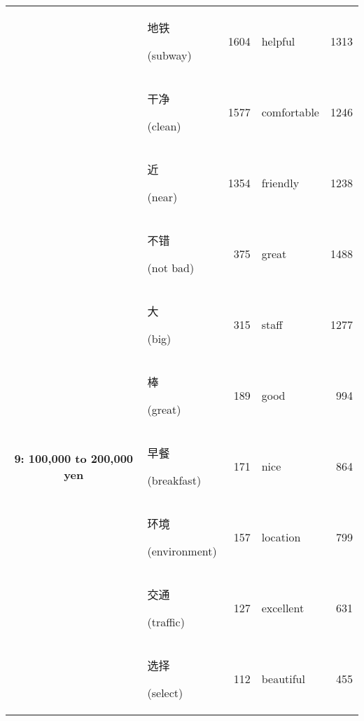 \documentclass[smallextended,natbib]{svjour3}       %
\begin{document}
\begin{table}[ht]
{\begin{tabular}{|c|lr|lr|}
                                                             & \begin{CJK}{UTF8}{gbsn}地铁\end{CJK} (subway)          & 1604  & helpful     & 1313  \\  
                                                             & \begin{CJK}{UTF8}{gbsn}干净\end{CJK} (clean)           & 1577  & comfortable & 1246  \\  
                                                             & \begin{CJK}{UTF8}{gbsn}近\end{CJK} (near)             & 1354  & friendly    & 1238  \\ \hline
        \multirow{10}{*}{\textbf{9: 100,000 to 200,000 yen}} & \begin{CJK}{UTF8}{gbsn}不错\end{CJK} (not bad)         & 375   & great       & 1488  \\  
                                                             & \begin{CJK}{UTF8}{gbsn}大\end{CJK} (big)              & 315   & staff       & 1277  \\  
                                                             & \begin{CJK}{UTF8}{gbsn}棒\end{CJK} (great)            & 189   & good        & 994   \\  
                                                             & \begin{CJK}{UTF8}{gbsn}早餐\end{CJK} (breakfast)       & 171   & nice        & 864   \\  
                                                             & \begin{CJK}{UTF8}{gbsn}环境\end{CJK} (environment)    & 157   & location    & 799   \\  
                                                             & \begin{CJK}{UTF8}{gbsn}交通\end{CJK} (traffic)         & 127   & excellent   & 631   \\  
                                                             & \begin{CJK}{UTF8}{gbsn}选择\end{CJK} (select)          & 112   & beautiful   & 455   \\  

\end{tabular}}
\end{table}
\end{document}
